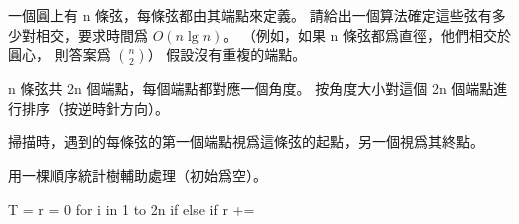 \startEXERCISE
一個圓上有 n 條弦，每條弦都由其端點來定義。
請給出一個算法確定這些弦有多少對相交，要求時間爲 $O(n\lg n)$。
（例如，如果 n 條弦都爲直徑，他們相交於圓心，
則答案爲 $\binom{n}{2}$）
假設沒有重複的端點。
\stopEXERCISE

\startANSWER
n 條弦共 2n 個端點，每個端點都對應一個角度。
按角度大小對這個 2n 個端點進行排序（按逆時針方向）。

掃描時，遇到的每條弦的第一個端點視爲這條弦的起點，另一個視爲其終點。

用一棵順序統計樹輔助處理（初始爲空）。

\startCLRSCODE
T = 
r = 0
for i in 1 to 2n
	if 
	else if 
		r += 
\stopCLRSCODE

\stopANSWER
